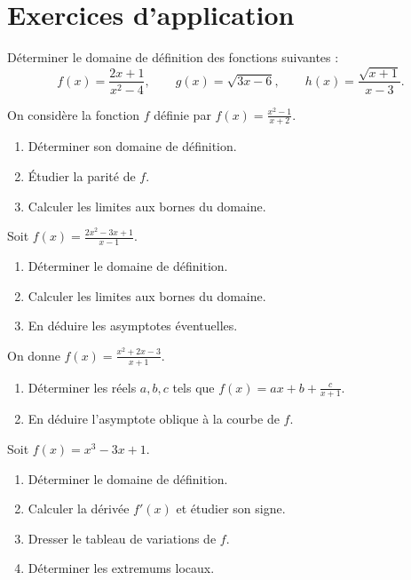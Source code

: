 \section{Exercices d'application}


\exo{}
Déterminer le domaine de définition des fonctions suivantes :
\[
f(x)=\frac{2x+1}{x^2-4},\qquad g(x)=\sqrt{3x-6},\qquad h(x)=\frac{\sqrt{x+1}}{x-3}.
\]

\exo{}
On considère la fonction \(f\) définie par \(f(x)=\frac{x^2-1}{x+2}\).
\begin{enumerate}[label=\alph*)]
\item Déterminer son domaine de définition.
\item Étudier la parité de \(f\).
\item Calculer les limites aux bornes du domaine.
\end{enumerate}


\exo{}
Soit \(f(x)=\frac{2x^2-3x+1}{x-1}\).
\begin{enumerate}[label=\alph*)]
\item Déterminer le domaine de définition.
\item Calculer les limites aux bornes du domaine.
\item En déduire les asymptotes éventuelles.
\end{enumerate}

\exo{}
On donne \(f(x)=\frac{x^2+2x-3}{x+1}\).
\begin{enumerate}[label=\alph*)]
\item Déterminer les réels \(a,b,c\) tels que \(f(x)=ax+b+\frac{c}{x+1}\).
\item En déduire l'asymptote oblique à la courbe de \(f\).
\end{enumerate}


\exo{}
Soit \(f(x)=x^3-3x+1\).
\begin{enumerate}[label=\alph*)]
\item Déterminer le domaine de définition.
\item Calculer la dérivée \(f'(x)\) et étudier son signe.
\item Dresser le tableau de variations de \(f\).
\item Déterminer les extremums locaux.
\end{enumerate}

